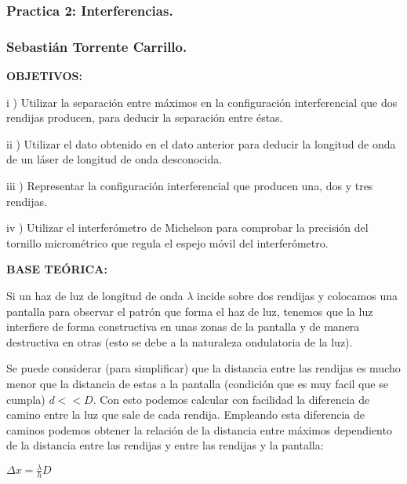\documentclass[12pt,thmsa]{article}
\begin{document}
\subsubsection{Practica 2: Interferencias.}

\subsubsection{Sebasti\'{a}n Torrente Carrillo.}

\textbf{OBJETIVOS:}

\vspace{1pt}

i ) Utilizar la separaci\'{o}n entre m\'{a}ximos en la configuraci\'{o}n
interferencial que dos rendijas producen, para deducir la separaci\'{o}n
entre \'{e}stas.

ii ) Utilizar el dato obtenido en el dato anterior para deducir la longitud
de onda de un l\'{a}ser de longitud de onda desconocida.

iii ) Representar la configuraci\'{o}n interferencial que producen una, dos
y tres rendijas.

iv ) Utilizar el interfer\'{o}metro de Michelson para comprobar la
precisi\'{o}n del tornillo microm\'{e}trico que regula el espejo m\'{o}vil
del interfer\'{o}metro.

\textbf{BASE TE\'{O}RICA:}

\vspace{1pt}

\vspace{1pt}Si un haz de luz de longitud de onda $\lambda $ incide sobre dos
rendijas y colocamos una pantalla para observar el patr\'{o}n que forma el
haz de luz, tenemos que la luz interfiere de forma constructiva en unas
zonas de la pantalla y de manera destructiva en otras (esto se debe a la
naturaleza ondulatoria de la luz).

Se puede considerar (para simplificar) que la distancia entre las rendijas
es mucho menor que la distancia de estas a la pantalla (condici\'{o}n que es
muy facil que se cumpla) $d<<D$. Con esto podemos calcular con facilidad la
diferencia de camino entre la luz que sale de cada rendija. Empleando esta
diferencia de caminos podemos obtener la relaci\'{o}n de la distancia entre
m\'{a}ximos dependiento de la distancia entre las rendijas y entre las
rendijas y la pantalla:

\vspace{1pt}

$\Delta x=\frac{\lambda }{h}D$
\end{document}
